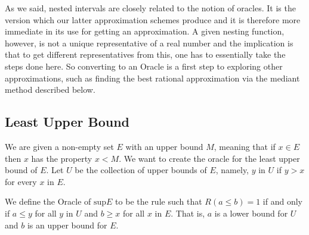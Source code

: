 \documentclass[12pt]{article}
\theoremstyle{remark}
\begin{document}
As we said, nested intervals are closely related to the notion of oracles. It is the version which our latter approximation schemes produce and it is therefore more immediate in its use for getting an approximation. A given nesting function, however, is not a unique representative of a real number and the implication is that to get different representatives from this, one has to essentially take the steps done here. So converting to an Oracle is a first step to exploring other approximations, such as finding the best rational approximation via the mediant method described below. 

\subsection{Least Upper Bound}

We are given a non-empty set $E$ with an upper bound $M$, meaning that if $x \in E$ then $x$ has the property $x < M$. We want to create the oracle for the least upper bound of $E$. Let $U$ be the collection of upper bounds of $E$, namely, $y$ in $U$ if $y > x$ for every $x$ in $E$. 

We define the Oracle of $\mathrm{sup} E$ to be the rule such that $R(a\leq b) = 1$ if and only if $a \leq y$ for all $y$ in $U$ and $b \geq x$ for all $x$ in $E$. That is, $a$ is a lower bound for $U$ and $b$ is an upper bound for $E$.
\end{document}
